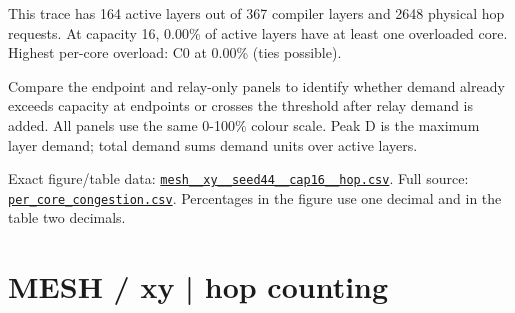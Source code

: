 \documentclass[10pt,a4paper]{article}
\begin{document}
This trace has 164 active layers out of 367 compiler layers and 2648 physical hop requests. At capacity 16, 0.00\% of active layers have at least one overloaded core. Highest per-core overload: C0 at 0.00\% (ties possible).\par
Compare the endpoint and relay-only panels to identify whether demand already exceeds capacity at endpoints or crosses the threshold after relay demand is added. All panels use the same 0-100\% colour scale. Peak D is the maximum layer demand; total demand sums demand units over active layers.\par
Exact figure/table data: \href{\detokenize{file:///home/dhruv-pansuriya/Documents/BTP/Compiler-Driven-ACE/output/pdf/qaoa_methods_congestion/tables/mesh__xy__seed44__cap16__hop.csv}}{\nolinkurl{mesh__xy__seed44__cap16__hop.csv}}. Full source: \href{\detokenize{file:///home/dhruv-pansuriya/Documents/BTP/Compiler-Driven-ACE/results/qaoa_2seed_2026-10-26/congestion/per_core_congestion.csv}}{\nolinkurl{per_core_congestion.csv}}. Percentages in the figure use one decimal and in the table two decimals.\par
\clearpage
\section*{MESH / xy | hop counting}
\end{document}
